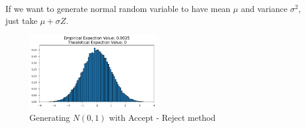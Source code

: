 \begin{example}
If we want to generate normal random variable to have mean $\mu$  and variance $\sigma^2 $, just take $\mu +\sigma Z $.
\begin{figure}[H]
    
    \centering
    \includegraphics[width=0.5\textwidth]{images/nor_AR.png}
    \caption{Generating $N(0,1)$ with Accept - Reject method}
\end{figure}
\end{example}



